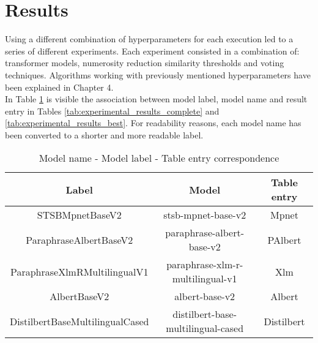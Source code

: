 \documentclass[\main/main.tex]{subfiles}
\begin{document}
\section{Results}
Using a different combination of hyperparameters for each execution led to a series of different experiments. Each experiment consisted in a combination of: transformer models, numerosity reduction similarity thresholds and voting techniques. Algorithms working with previously mentioned hyperparameters have been explained in Chapter 4.\\
In Table \ref{tab:model_name_model_label} is visible the association between model label, model name and result entry in Tables \ref{tab:experimental_results_complete} and \ref{tab:experimental_results_best}. For readability reasons, each model name has been converted to a shorter and more readable label.
\begin{table}[H]
    \centering
    \begin{tabular}{| c | c | c |}
        \hline
        Label & Model & Table entry\\ 
        \hline
        STSBMpnetBaseV2 & stsb-mpnet-base-v2 & Mpnet     \\
        ParaphraseAlbertBaseV2 & paraphrase-albert-base-v2 & PAlbert     \\
        ParaphraseXlmRMultilingualV1 & paraphrase-xlm-r-multilingual-v1 & Xlm    \\
        AlbertBaseV2 & albert-base-v2 & Albert     \\
        DistilbertBaseMultilingualCased & distilbert-base-multilingual-cased & Distilbert     \\ 
        \hline
    \end{tabular}
    \caption{Model name - Model label - Table entry correspondence}
    \label{tab:model_name_model_label}
\end{table}
\end{document}
